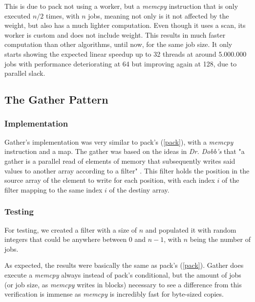 \documentclass[10pt,journal]{IEEEtran}
\begin{document}
This is due to pack not using a worker, but a \textit{memcpy} instruction that is only executed $ n / 2 $ times, with $ n $ jobs, meaning not only is it not affected by the weight, but also has a much lighter computation. Even though it uses a scan, its worker is custom and does not include weight. This results in much faster computation than other algorithms, until now, for the same job size. It only starts showing the expected linear speedup up to 32 threads at around 5.000.000 jobs with performance deteriorating at 64 but improving again at 128, due to parallel slack.

\subsection{The Gather Pattern}
\label{gather}

\subsubsection{Implementation}

Gather's implementation was very similar to pack's (\ref{pack}), with a \textit{memcpy} instruction and a map. The gather was based on the ideas in \textit{Dr. Dobb's} that "a gather is a parallel read of elements of memory that subsequently writes said values to another array according to a filter" \cite{dobbgather}. This filter holds the position in the source array of the element to write for each position, with each index $ i $ of the filter mapping to the same index $ i $ of the destiny array.

\subsubsection{Testing}

For testing, we created a filter with a size of $ n $ and populated it with random integers that could be anywhere between 0 and $ n - 1 $, with $ n $ being the number of jobs.

As expected, the results were basically the same as pack's (\ref{pack}). Gather does execute a \textit{memcpy} always instead of pack's conditional, but the amount of jobs (or job size, as \textit{memcpy} writes in blocks) necessary to see a difference from this verification is immense as \textit{memcpy} is incredibly fast for byte-sized copies.

\end{document}
